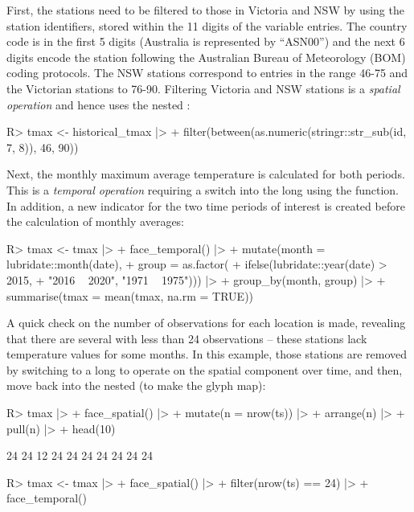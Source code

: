 \documentclass[
  shortnames]{jss}
\begin{document}
First, the stations need to be filtered to those in Victoria and NSW by using the station identifiers, stored within the 11 digits of the  variable entries. The country code is in the first 5 digits (Australia is represented by ``ASN00'') and the next 6 digits encode the station following the Australian Bureau of Meteorology (BOM) \citep{bom} coding protocols. The NSW stations correspond to entries in the range 46-75 and the Victorian stations to 76-90. Filtering Victoria and NSW stations is a \emph{spatial operation} and hence uses the nested :

\begin{CodeChunk}
\begin{CodeInput}
R> tmax <- historical_tmax |>
+   filter(between(as.numeric(stringr::str_sub(id, 7, 8)), 46, 90))
\end{CodeInput}
\end{CodeChunk}

Next, the monthly maximum average temperature is calculated for both periods. This is a \emph{temporal operation} requiring a switch into the long  using the  function. In addition, a new indicator for the two time periods of interest is created before the calculation of monthly averages:

\begin{CodeChunk}
\begin{CodeInput}
R> tmax <- tmax |>
+   face_temporal() |> 
+   mutate(month = lubridate::month(date),
+          group = as.factor(
+            ifelse(lubridate::year(date) > 2015,
+            "2016 ~ 2020", "1971 ~ 1975"))) |>
+   group_by(month, group) |> 
+   summarise(tmax = mean(tmax, na.rm = TRUE))
\end{CodeInput}
\end{CodeChunk}

A quick check on the number of observations for each location is made, revealing that there are several with less than 24 observations -- these stations lack temperature values for some months. In this example, those stations are removed by switching to a long  to operate on the spatial component over time, and then, move back into the nested  (to make the glyph map):

\begin{CodeChunk}
\begin{CodeInput}
R> tmax |> 
+   face_spatial() |> 
+   mutate(n = nrow(ts)) |>
+   arrange(n) |>
+   pull(n) |> 
+   head(10)
\end{CodeInput}
\begin{CodeOutput}
 [1] 24 24 12 24 24 24 24 24 24 24
\end{CodeOutput}
\begin{CodeInput}
R> tmax <- tmax |> 
+   face_spatial() |> 
+   filter(nrow(ts) == 24) |>
+   face_temporal()
\end{CodeInput}
\end{CodeChunk}
\end{document}

